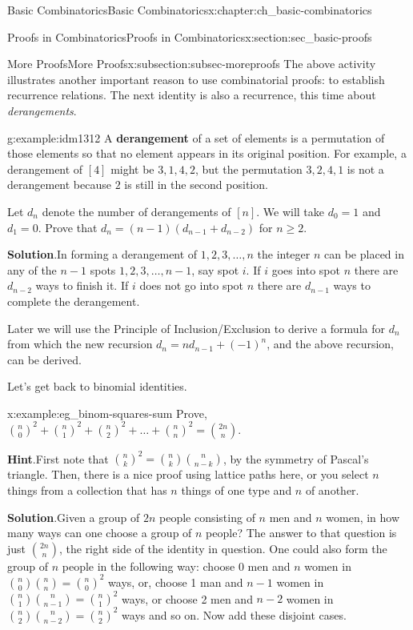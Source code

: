 \documentclass[oneside,10pt,]{book}
\newcommand{\terminology}[1]{\textbf{#1}}
\numberwithin{equation}{chapter}
\begin{document}
\begin{chapterptx}{Basic Combinatorics}{}{Basic Combinatorics}{}{}{x:chapter:ch_basic-combinatorics}
\begin{sectionptx}{Proofs in Combinatorics}{}{Proofs in Combinatorics}{}{}{x:section:sec_basic-proofs}
\begin{subsectionptx}{More Proofs}{}{More Proofs}{}{}{x:subsection:subsec-moreproofs}
The above activity illustrates another important reason to use combinatorial proofs: to establish recurrence relations.  The next identity is also a recurrence, this time about \emph{derangements}.%
\begin{example}{}{g:example:idm1312}%
A \terminology{derangement} of a set of elements is a permutation of those elements so that no element appears in its original position.  For example, a derangement of \([4]\) might be \(3,1,4,2\), but the permutation \(3,2,4,1\) is not a derangement because \(2\) is still in the second position.%
\par
Let \(d_{n}\) denote the number of derangements of \([n]\).  We will take \(d_{0} = 1\) and \(d_{1} = 0\).  Prove that \(d_{n} = (n - 1)(d_{n - 1}+ d_{n - 2})\) for \(n \geq 2\).%
\par\smallskip%
\noindent\textbf{Solution}.\hypertarget{g:solution:idm1327}{}\quad{}In forming a derangement of \(1, 2, 3, \ldots, n\) the integer \(n\) can be placed in any of the \(n - 1\) spots \(1, 2, 3, \ldots, n - 1\), say spot \(i\). If \(i\) goes into spot \(n\) there are \(d_{n - 2}\) ways to finish it. If \(i\) does not go into spot \(n\) there are \(d_{n - 1}\) ways to complete the derangement.%
\end{example}
Later we will use the Principle of Inclusion\slash{}Exclusion to derive a formula for \(d_{n}\) from which the new recursion \(d_{n} = nd_{n - 1} + \left( - 1 \right)^{n}\), and the above recursion, can be derived.%
\par
Let's get back to binomial identities.%
\begin{example}{}{x:example:eg_binom-squares-sum}%
Prove, \(\binom{n}{0}^{2} + \binom{n}{1}^{2} + \binom{n}{2}^{2} + \ldots + \binom{n}{n}^{2} = \binom{2n}{n}\).%
\par\smallskip%
\noindent\textbf{Hint}.\hypertarget{g:hint:idm1348}{}\quad{}First note that \(\binom{n}{k}^2 = \binom{n}{k}\binom{n}{n-k}\), by the symmetry of Pascal's triangle.  Then, there is a nice proof using lattice paths here, or you select \(n\) things from a collection that has \(n\) things of one type and \(n\) of another.%
\par\smallskip%
\noindent\textbf{Solution}.\hypertarget{g:solution:idm1354}{}\quad{}Given a group of \(2n\) people consisting of \(n\) men and \(n\) women, in how many ways can one choose a group of \(n\) people? The answer to that question is just \(\binom{2n}{n}\), the right side of the identity in question. One could also form the group of \(n\) people in the following way: choose 0 men and \(n\) women in \(\binom{n}{0} \binom{n}{n} = \binom{n}{0}^{2}\) ways, or, choose 1 man and \(n - 1\) women in \(\binom{n}{1} \binom{n}{n - 1} = \binom{n}{1}^{2}\) ways, or choose 2 men and \(n - 2\) women in \(\binom{n}{2} \binom{n}{n - 2} = \binom{n}{2}^{2}\) ways and so on. Now add these disjoint cases.%

\end{example}
\end{subsectionptx}
\end{sectionptx}
\end{chapterptx}
\end{document}
